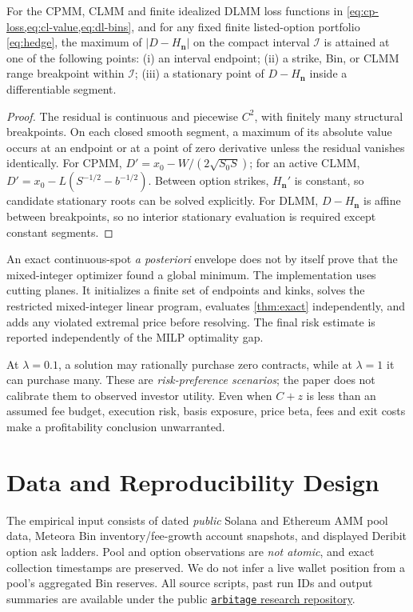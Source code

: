 \begin{theorem}
\label{thm:exact}
For the CPMM, CLMM and finite idealized DLMM loss functions in \cref{eq:cp-loss,eq:cl-value,eq:dl-bins}, and for any fixed finite listed-option portfolio \eqref{eq:hedge}, the maximum of $|D-H_{\bm n}|$ on the compact interval $\mathcal I$ is attained at one of the following points:
(i) an interval endpoint;
(ii) a strike, Bin, or CLMM range breakpoint within $\mathcal I$;
(iii) a stationary point of $D-H_{\bm n}$ inside a differentiable segment.
\end{theorem}
\begin{proof}
The residual is continuous and piecewise $C^2$, with finitely many structural breakpoints. On each closed smooth segment, a maximum of its absolute value occurs at an endpoint or at a point of zero derivative unless the residual vanishes identically. For CPMM, $D'=x_0-W/(2\sqrt{S_0S})$; for an active CLMM, $D'=x_0-L(S^{-1/2}-b^{-1/2})$. Between option strikes, $H_{\bm n}'$ is constant, so candidate stationary roots can be solved explicitly. For DLMM, $D-H_{\bm n}$ is affine between breakpoints, so no interior stationary evaluation is required except constant segments.
\end{proof}
An exact continuous-spot \emph{a posteriori} envelope does not by itself prove that the mixed-integer optimizer found a global minimum. The implementation uses cutting planes. It initializes a finite set of endpoints and kinks, solves the restricted mixed-integer linear program, evaluates \cref{thm:exact} independently, and adds any violated extremal price before resolving. The final risk estimate is reported independently of the MILP optimality gap.

\begin{remark}
At $\lambda=0.1$, a solution may rationally purchase zero contracts, while at $\lambda=1$ it can purchase many. These are \emph{risk-preference scenarios}; the paper does not calibrate them to observed investor utility. Even when $C+z$ is less than an assumed fee budget, execution risk, basis exposure, price beta, fees and exit costs make a profitability conclusion unwarranted.
\end{remark}

\section{Data and Reproducibility Design}
The empirical input consists of dated \emph{public} Solana and Ethereum AMM pool data, Meteora Bin inventory/fee-growth account snapshots, and displayed Deribit option ask ladders. Pool and option observations are \emph{not atomic}, and exact collection timestamps are preserved. We do not infer a live wallet position from a pool's aggregated Bin reserves. All source scripts, past run IDs and output summaries are available under the public \href{https://github.com/evaristebernhard/arbitage}{\texttt{arbitage} research repository}.

